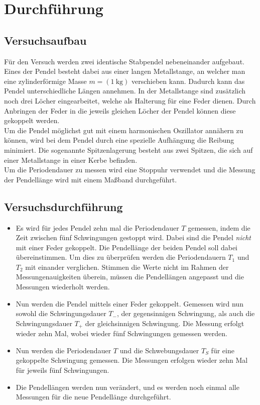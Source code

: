 \section{Durchführung}
\label{sec:Durchführung}
\subsection{Versuchsaufbau}
Für den Versuch werden zwei identische Stabpendel nebeneinander aufgebaut. Eines der Pendel besteht dabei aus einer langen Metallstange, an welcher man eine
zylinderförmige Masse $m=(\SI{1}{\kilo\gram})$ verschieben kann. Dadurch kann das Pendel unterschiedliche Längen annehmen. In der Metallstange sind zusätzlich
noch drei Löcher eingearbeitet, welche als Halterung für eine Feder dienen. Durch Anbringen der Feder in die jeweils gleichen Löcher der Pendel können diese
gekoppelt werden.
\\
Um die Pendel möglichst gut mit einem harmonischen Oszillator annähern zu können, wird bei dem Pendel durch eine spezielle Aufhängung die Reibung minimiert.
Die sogenannte Spitzenlagerung besteht aus zwei Spitzen, die sich auf einer Metallstange in einer Kerbe befinden. 
\\
Um die Periodendauer zu messen wird eine Stoppuhr verwendet und die Messung der Pendellänge wird mit einem Maßband durchgeführt.
\subsection{Versuchsdurchführung}
\begin{itemize}
    \item Es wird für jedes Pendel zehn mal die Periodendauer $T$ gemessen, indem die Zeit zwischen fünf Schwingungen gestoppt wird. Dabei sind die Pendel
        \textit{nicht} mit einer Feder gekoppelt. Die Pendellänge der beiden Pendel soll dabei übereinstimmen. Um dies zu überprüfen werden die Periodendauern
        $T_1$ und $T_2$ mit einander verglichen. Stimmen die Werte nicht im Rahmen der Messungenauigkeiten überein, müssen die Pendellängen angepasst und die
        Messungen wiederholt werden.
    \item Nun werden die Pendel mittels einer Feder gekoppelt. Gemessen wird nun sowohl die Schwingungsdauer $T_-$, der gegensinnigen Schwingung, als auch die
        Schwingungsdauer $T_+$ der gleichsinnigen Schwingung. Die Messung erfolgt wieder zehn Mal, wobei wieder fünf Schwingungen gemessen werden.
    \item Nun werden die Periodendauer $T$ und die Schwebungsdauer $T_S$ für eine gekoppelte Schwingung gemessen. Die Messungen erfolgen wieder zehn Mal für
        jeweils fünf Schwingungen.
    \item Die Pendellängen werden nun verändert, und es werden noch einmal alle Messungen für die neue Pendellänge durchgeführt.
\end{itemize}
